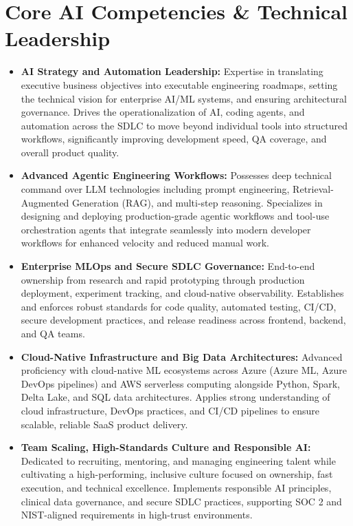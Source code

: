 \documentclass[9pt, letterpaper]{extarticle}
\begin{document}
\section{Core AI Competencies \& Technical Leadership}
\begin{itemize}
\item \textbf{AI Strategy and Automation Leadership:} Expertise in translating executive business objectives into executable engineering roadmaps, setting the technical vision for enterprise AI/ML systems, and ensuring architectural governance. Drives the operationalization of AI, coding agents, and automation across the SDLC to move beyond individual tools into structured workflows, significantly improving development speed, QA coverage, and overall product quality.
\item \textbf{Advanced Agentic Engineering Workflows:} Possesses deep technical command over LLM technologies including prompt engineering, Retrieval-Augmented Generation (RAG), and multi-step reasoning. Specializes in designing and deploying production-grade agentic workflows and tool-use orchestration agents that integrate seamlessly into modern developer workflows for enhanced velocity and reduced manual work.
\item \textbf{Enterprise MLOps and Secure SDLC Governance:} End-to-end ownership from research and rapid prototyping through production deployment, experiment tracking, and cloud-native observability. Establishes and enforces robust standards for code quality, automated testing, CI/CD, secure development practices, and release readiness across frontend, backend, and QA teams.
\item \textbf{Cloud-Native Infrastructure and Big Data Architectures:} Advanced proficiency with cloud-native ML ecosystems across Azure (Azure ML, Azure DevOps pipelines) and AWS serverless computing alongside Python, Spark, Delta Lake, and SQL data architectures. Applies strong understanding of cloud infrastructure, DevOps practices, and CI/CD pipelines to ensure scalable, reliable SaaS product delivery.
\item \textbf{Team Scaling, High-Standards Culture and Responsible AI:} Dedicated to recruiting, mentoring, and managing engineering talent while cultivating a high-performing, inclusive culture focused on ownership, fast execution, and technical excellence. Implements responsible AI principles, clinical data governance, and secure SDLC practices, supporting SOC 2 and NIST-aligned requirements in high-trust environments.
\end{itemize}
\end{document}
